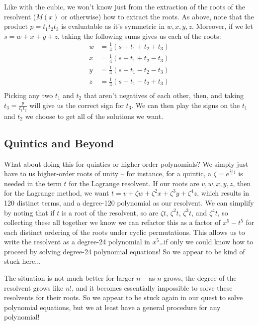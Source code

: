 \documentclass[12pt]{scrartcl}
\begin{document}
Like with the cubic, we won't know just from the extraction of the roots of the resolvent ($M(x)$ or otherwise) how to extract the roots. As above, note that the product $p = t_1 t_2 t_3$ is evaluatable as it's symmetric in $w, x, y, z$. Moreover, if we let $s = w + x + y + z$, taking the following sums gives us each of the roots: 
\begin{align*}
    w &= \frac 14 (s + t_1 + t_2 + t_3) \\ 
    x &= \frac 14 (s - t_1 + t_2 - t_3) \\ 
    y &= \frac 14 (s + t_1 - t_2 - t_3) \\ 
    z &= \frac 14 (s - t_1 - t_2 + t_3) \\ 
\end{align*}
Picking any two $t_1$ and $t_2$ that aren't negatives of each other, then, and taking $t_3 = \frac p {t_1 t_2}$ will give us the correct sign for $t_3$. We can then play the signs on the $t_1$ and $t_2$ we choose to get all of the solutions we want. 

\subsection{Quintics and Beyond}
What about doing this for quintics or higher-order polynomials? We simply just have to us higher-order roots of unity -- for instance, for a quintic, a $\zeta = e^{\frac{2\pi}5 i}$ is needed in the term $t$ for the Lagrange resolvent. If our roots are $v, w, x, y, z$, then for the Lagrange method, we want $t = v + \zeta w + \zeta^2 x + \zeta^3 y + \zeta^4 z$, which results in 120 distinct terms, and a degree-120 polynomial as our resolvent. We can simplify by noting that if $t$ is a root of the resolvent, so are $\zeta t$, $\zeta^2 t$, $\zeta^3 t$, and $\zeta^4 t$, so collecting these all together we know we can refactor this as a factor of $x^5 - t^5$ for each distinct ordering of the roots under cyclic permutations. This allows us to write the resolvent as a degree-24 polynomial in $x^5$\dots if only we could know how to proceed by solving degree-24 polynomial equations! So we appear to be kind of stuck here...

The situation is not much better for larger $n$ -- as $n$ grows, the degree of the resolvent grows like $n!$, and it becomes essentially impossible to solve these resolvents for their roots. So we appear to be stuck again in our quest to solve polynomial equations, but we at least have a general procedure for any polynomial! 
\end{document}
